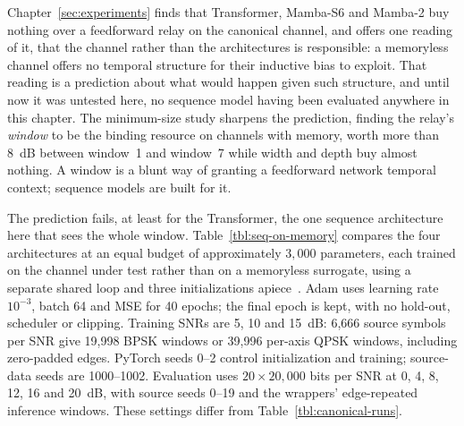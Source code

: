 Chapter~\ref{sec:experiments} finds that Transformer, Mamba-S6 and Mamba-2 buy nothing over a feedforward relay on the canonical channel, and offers one reading of it, that the channel rather than the architectures is responsible: a memoryless channel offers no temporal structure for their inductive bias to exploit. That reading is a prediction about what would happen given such structure, and until now it was untested here, no sequence model having been evaluated anywhere in this chapter. The minimum-size study sharpens the prediction, finding the relay's \emph{window} to be the binding resource on channels with memory, worth more than 8~dB between window~1 and window~7 while width and depth buy almost nothing. A window is a blunt way of granting a feedforward network temporal context; sequence models are built for it.

The prediction fails, at least for the Transformer, the one sequence architecture here that sees the whole window. Table~\ref{tbl:seq-on-memory} compares the four architectures at an equal budget of approximately $3{,}000$ parameters, each trained on the channel under test rather than on a memoryless surrogate, using a separate shared loop and three initializations apiece~. Adam uses learning rate $10^{-3}$, batch 64 and MSE for 40 epochs; the final epoch is kept, with no hold-out, scheduler or clipping. Training SNRs are 5, 10 and 15~dB: 6,666 source symbols per SNR give 19,998 BPSK windows or 39,996 per-axis QPSK windows, including zero-padded edges. PyTorch seeds 0--2 control initialization and training; source-data seeds are 1000--1002. Evaluation uses $20\times20{,}000$ bits per SNR at 0, 4, 8, 12, 16 and 20~dB, with source seeds 0--19 and the wrappers' edge-repeated inference windows. These settings differ from Table~\ref{tbl:canonical-runs}.

